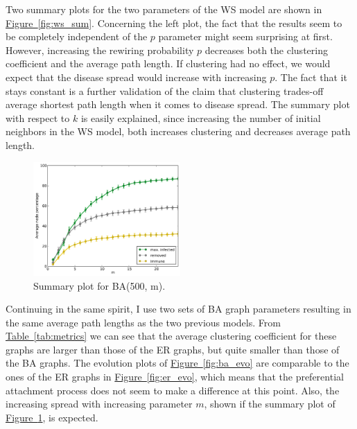 \documentclass[11pt]{article} %
\newcommand{\figref}[1]{\mbox{Figure~\ref{#1}}}
\newcommand{\tabref}[1]{\mbox{Table~\ref{#1}}}
\renewcommand{\figref}[1]{\hyperref[#1]{\mbox{Figure~\ref*{#1}}}}
\renewcommand{\tabref}[1]{\hyperref[#1]{\mbox{Table~\ref*{#1}}}}
\begin{document}
Two summary plots for the two parameters of the WS model are shown in
\figref{fig:ws_sum}. Concerning the left plot, the fact that the
results seem to be completely independent of the $p$ parameter might
seem surprising at first.
However, increasing the rewiring probability $p$ decreases both the
clustering coefficient and the average path length. If clustering
had no effect, we would expect that the disease spread would increase
with increasing $p$. The fact that it stays constant is a further validation
of the claim that clustering trades-off average shortest path length
when it comes to disease spread. The summary plot with respect to $k$
is easily explained, since increasing the number of initial neighbors
in the WS model, both increases clustering and decreases average
path length.

\begin{figure}
  \centering
  \vspace{-15pt}
  \includegraphics[width=0.5\textwidth]{figures/sum_BA_500_m}
  \vspace{-17pt}
  \caption{Summary plot for BA(500, m).}
  \label{fig:ba_sum}
\end{figure}

Continuing in the same spirit, I use two sets of BA graph parameters resulting
in the same average
path lengths as the two previous models. From \tabref{tab:metrics}
we can see that the average clustering coefficient for these graphs
are larger than those of the ER graphs, but quite smaller than those
of the BA graphs. The evolution plots of \figref{fig:ba_evo}
are comparable to the ones of the ER graphs in \figref{fig:er_evo},
which means that the preferential attachment process does not seem
to make a difference at this point. Also, the increasing spread with
increasing parameter $m$, shown if the summary plot of
\figref{fig:ba_sum}, is expected.
\end{document}
